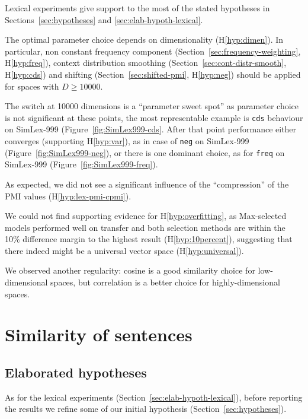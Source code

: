 Lexical experiments give support to the most of the stated hypotheses in Sections~\ref{sec:hypotheses} and \ref{sec:elab-hypoth-lexical}.

The optimal parameter choice depends on dimensionality (H\ref{hyp:dimen}). In particular, non constant frequency component (Section~\ref{sec:frequency-weighting}, H\ref{hyp:freq}), context distribution smoothing (Section~\ref{sec:cont-distr-smooth}, H\ref{hyp:cds}) and shifting (Section~\ref{sec:shifted-pmi}, H\ref{hyp:neg}) should be applied for spaces with $D \geq 10000$.

The switch at 10000 dimensions is a ``parameter sweet spot'' as parameter choice is not significant at these points, the most representable example is \texttt{cds} behaviour on SimLex-999 (Figure~\ref{fig:SimLex999-cds}. After that point performance either converges (supporting H\ref{hyp:var}), as in case of \texttt{neg} on SimLex-999 (Figure~\ref{fig:SimLex999-neg}), or there is one dominant choice, as for \texttt{freq} on SimLex-999 (Figure~\ref{fig:SimLex999-freq}).

As expected, we did not see a significant influence of the ``compression'' of the PMI values (H\ref{hyp:lex-pmi-cpmi}).

We could not find supporting evidence for H\ref{hyp:overfitting}, as Max-selected models performed well on transfer and both selection methods are within the 10\% difference margin to the highest result (H\ref{hyp:10percent}), suggesting that there indeed might be a universal vector space (H\ref{hyp:universal}).

We observed another regularity: cosine is a good similarity choice for low-dimensional spaces, but correlation is a better choice for highly-dimensional spaces.

\chapter{Similarity of sentences}
\label{sec:sentential}


\section{Elaborated hypotheses}
\label{sec:elab-hypoth-comp}

As for the lexical experiments (Section~\ref{sec:elab-hypoth-lexical}), before reporting the results we refine some of our initial hypothesis (Section~\ref{sec:hypotheses}).

